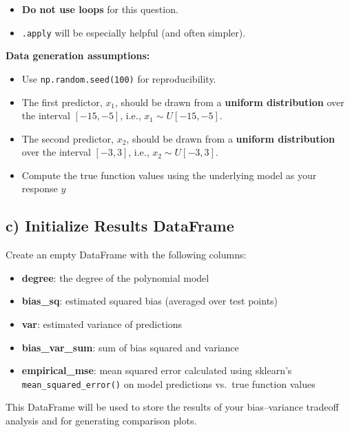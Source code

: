\documentclass[
  letterpaper,
  DIV=11,
  numbers=noendperiod]{scrreprt}
\providecommand{\tightlist}{%
  \setlength{\itemsep}{0pt}\setlength{\parskip}{0pt}}\usepackage{longtable,booktabs,array}
\begin{document}
\begin{itemize}
\tightlist
\item
  \textbf{Do not use loops} for this question.
\item
  \texttt{.apply} will be especially helpful (and often simpler).
\end{itemize}

\textbf{Data generation assumptions:}

\begin{itemize}
\tightlist
\item
  Use \texttt{np.random.seed(100)} for reproducibility.
\item
  The first predictor, \(x_1\), should be drawn from a \textbf{uniform
  distribution} over the interval \([-15, -5]\), i.e.,
  \(x_1 \sim U[-15, -5]\).
\item
  The second predictor, \(x_2\), should be drawn from a \textbf{uniform
  distribution} over the interval \([-3, 3]\), i.e.,
  \(x_2 \sim U[-3, 3]\).
\item
  Compute the true function values using the underlying model as your
  response \(y\)
\end{itemize}

\subsection{c) Initialize Results
DataFrame}\label{c-initialize-results-dataframe}

Create an empty DataFrame with the following columns:

\begin{itemize}
\tightlist
\item
  \textbf{degree}: the degree of the polynomial model\\
\item
  \textbf{bias\_sq}: estimated squared bias (averaged over test
  points)\\
\item
  \textbf{var}: estimated variance of predictions\\
\item
  \textbf{bias\_var\_sum}: sum of bias squared and variance\\
\item
  \textbf{empirical\_mse}: mean squared error calculated using sklearn's
  \texttt{mean\_squared\_error()} on model predictions vs.~true function
  values
\end{itemize}

This DataFrame will be used to store the results of your bias--variance
tradeoff analysis and for generating comparison plots.
\end{document}

